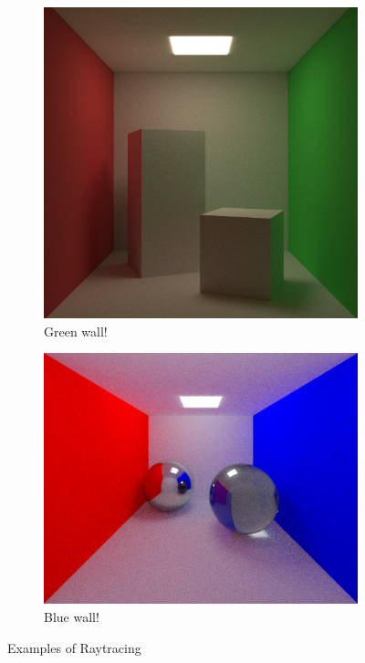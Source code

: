 \documentclass{article}
\begin{document}
\begin{figure}
    \centering
    \begin{subfigure}{0.44\textwidth}
        \centering
        \includegraphics[width=\linewidth]{fig1.png}
        \caption{Green wall!}
    \end{subfigure}
    \begin{subfigure}{0.55\textwidth}
        \centering
        \includegraphics[width=\linewidth]{fig2.png}
        \caption{Blue wall!}
    \end{subfigure}
    \caption{Examples of Raytracing}
    \label{fig:fig1}
\end{figure}
\end{document}
